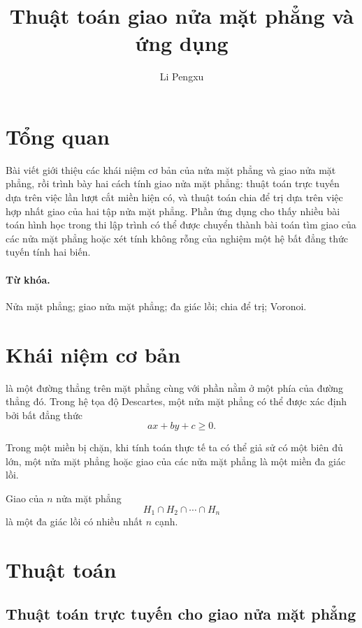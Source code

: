 \documentclass[11pt]{article}
\title{Thuật toán giao nửa mặt phẳng và ứng dụng}
\author{Li Pengxu}
\date{}
\begin{document}
\maketitle


\section*{Tổng quan}

Bài viết giới thiệu các khái niệm cơ bản của nửa mặt phẳng và giao nửa mặt
phẳng, rồi trình bày hai cách tính giao nửa mặt phẳng: thuật toán trực tuyến
dựa trên việc lần lượt cắt miền hiện có, và thuật toán chia để trị dựa trên
việc hợp nhất giao của hai tập nửa mặt phẳng. Phần ứng dụng cho thấy nhiều
bài toán hình học trong thi lập trình có thể được chuyển thành bài toán tìm
giao của các nửa mặt phẳng hoặc xét tính không rỗng của nghiệm một hệ bất
đẳng thức tuyến tính hai biến.

\paragraph{Từ khóa.}
Nửa mặt phẳng; giao nửa mặt phẳng; đa giác lồi; chia để trị; Voronoi.

\tableofcontents

\section{Khái niệm cơ bản}

 là một đường thẳng trên mặt phẳng cùng với phần nằm ở
một phía của đường thẳng đó. Trong hệ tọa độ Descartes, một nửa mặt phẳng có
thể được xác định bởi bất đẳng thức
\[
  ax+by+c\ge 0.
\]

Trong một miền bị chặn, khi tính toán thực tế ta có thể giả sử có một biên đủ
lớn, một nửa mặt phẳng hoặc giao của các nửa mặt phẳng là một miền đa giác
lồi.

Giao của \(n\) nửa mặt phẳng
\[
  H_1\cap H_2\cap \cdots \cap H_n
\]
là một đa giác lồi có nhiều nhất \(n\) cạnh.

\section{Thuật toán}

\subsection{Thuật toán trực tuyến cho giao nửa mặt phẳng}
\end{document}
